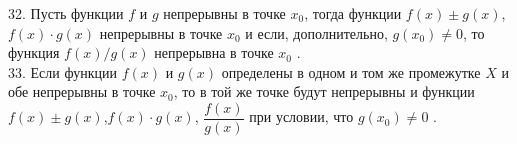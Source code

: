 \documentclass[12pt]{article}
\begin{document}
32. Пусть функции ${\displaystyle f}$ и ${\displaystyle g}$ непрерывны в точке ${\displaystyle x_0}$, тогда функции ${\displaystyle f(x) \pm g(x)}$, ${\displaystyle f(x) \cdot g(x)}$ непрерывны в точке ${\displaystyle x_0}$ и если, дополнительно, ${\displaystyle g(x_0)\neq 0}$, то функция ${\displaystyle f(x)/g(x)}$ непрерывна в точке ${\displaystyle x_0}$ .\\

33. Если функции ${\displaystyle f(x)}$ и ${\displaystyle g(x)}$ определены в одном и том же промежутке ${\displaystyle X}$ и обе непрерывны в точке ${\displaystyle x_0}$, то в той же точке будут непрерывны и функции ${\displaystyle f(x) \pm g(x)}$,${\displaystyle f(x) \cdot g(x)}$, ${\displaystyle \dfrac{f(x)}{g(x)}}$ при условии, что ${\displaystyle g(x_0) \neq 0}$ .\\
\end{document}
